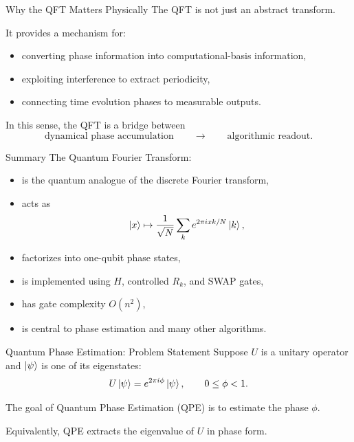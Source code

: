 \documentclass{beamer}
\begin{document}
\begin{frame}{Why the QFT Matters Physically}
The QFT is not just an abstract transform.

It provides a mechanism for:
\begin{itemize}
\item converting phase information into computational-basis information,
\item exploiting interference to extract periodicity,
\item connecting time evolution phases to measurable outputs.
\end{itemize}

In this sense, the QFT is a bridge between
\[
\text{dynamical phase accumulation}
\qquad\longrightarrow\qquad
\text{algorithmic readout}.
\]
\end{frame}

\begin{frame}{Summary}
The Quantum Fourier Transform:
\begin{itemize}
\item is the quantum analogue of the discrete Fourier transform,
\item acts as
\[
\ket{x}\mapsto \frac{1}{\sqrt N}\sum_k e^{2\pi i xk/N}\ket{k},
\]
\item factorizes into one-qubit phase states,
\item is implemented using \(H\), controlled \(R_k\), and SWAP gates,
\item has gate complexity \(O(n^2)\),
\item is central to phase estimation and many other algorithms.
\end{itemize}
\end{frame}


\begin{frame}{Quantum Phase Estimation: Problem Statement}
Suppose \(U\) is a unitary operator and \(\ket{\psi}\) is one of its eigenstates:
\[
U\ket{\psi}=e^{2\pi i \phi}\ket{\psi},
\qquad 0\le \phi <1.
\]

The goal of Quantum Phase Estimation (QPE) is to estimate the phase \(\phi\).

Equivalently, QPE extracts the eigenvalue of \(U\) in phase form.
\end{frame}
\end{document}
